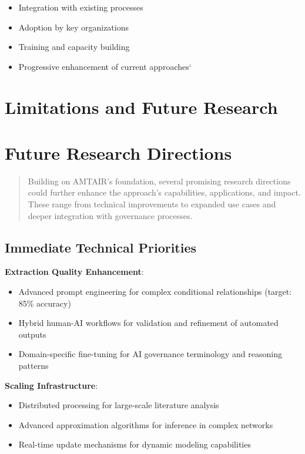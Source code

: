 \documentclass[
  11pt,
  letterpaper,
]{book}
\providecommand{\tightlist}{%
  \setlength{\itemsep}{0pt}\setlength{\parskip}{0pt}}
\begin{document}
\begin{itemize}
\tightlist
\item
  Integration with existing processes
\item
  Adoption by key organizations
\item
  Training and capacity building
\item
  Progressive enhancement of current approaches`
\end{itemize}

\section{Limitations and Future Research}\label{sec-future-research3}

\section{Future Research Directions}\label{future-research-directions}

\begin{quote}
Building on AMTAIR's foundation, several promising research directions
could further enhance the approach's capabilities, applications, and
impact. These range from technical improvements to expanded use cases
and deeper integration with governance processes.
\end{quote}

\subsection{Immediate Technical
Priorities}\label{sec-technical-priorities2}

\textbf{Extraction Quality Enhancement}:

\begin{itemize}
\tightlist
\item
  Advanced prompt engineering for complex conditional relationships
  (target: 85\% accuracy)
\item
  Hybrid human-AI workflows for validation and refinement of automated
  outputs
\item
  Domain-specific fine-tuning for AI governance terminology and
  reasoning patterns
\end{itemize}

\textbf{Scaling Infrastructure}:

\begin{itemize}
\tightlist
\item
  Distributed processing for large-scale literature analysis
\item
  Advanced approximation algorithms for inference in complex networks
\item
  Real-time update mechanisms for dynamic modeling capabilities
\end{itemize}
\end{document}
